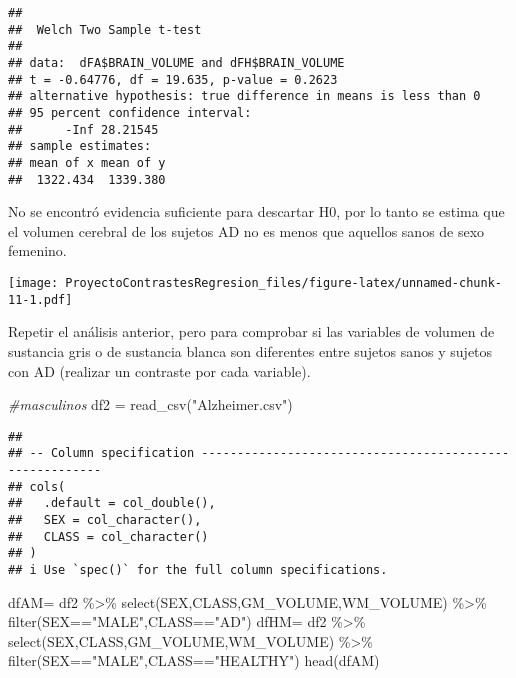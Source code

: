 \documentclass[
]{article}
\newenvironment{Shaded}{\begin{snugshade}}{\end{snugshade}}
\newcommand{\CommentTok}[1]{\textcolor[rgb]{0.56,0.35,0.01}{\textit{#1}}}
\newcommand{\FunctionTok}[1]{\textcolor[rgb]{0.00,0.00,0.00}{#1}}
\newcommand{\NormalTok}[1]{#1}
\newcommand{\OtherTok}[1]{\textcolor[rgb]{0.56,0.35,0.01}{#1}}
\newcommand{\SpecialCharTok}[1]{\textcolor[rgb]{0.00,0.00,0.00}{#1}}
\newcommand{\StringTok}[1]{\textcolor[rgb]{0.31,0.60,0.02}{#1}}
\begin{document}
\begin{verbatim}
## 
##  Welch Two Sample t-test
## 
## data:  dFA$BRAIN_VOLUME and dFH$BRAIN_VOLUME
## t = -0.64776, df = 19.635, p-value = 0.2623
## alternative hypothesis: true difference in means is less than 0
## 95 percent confidence interval:
##      -Inf 28.21545
## sample estimates:
## mean of x mean of y 
##  1322.434  1339.380
\end{verbatim}

No se encontró evidencia suficiente para descartar H0, por lo tanto se
estima que el volumen cerebral de los sujetos AD no es menos que
aquellos sanos de sexo femenino.

\begin{Shaded}
\end{Shaded}

\texttt{[image: ProyectoContrastesRegresion\_files/figure-latex/unnamed-chunk-11-1.pdf]}

Repetir el análisis anterior, pero para comprobar si las variables de
volumen de sustancia gris o de sustancia blanca son diferentes entre
sujetos sanos y sujetos con AD (realizar un contraste por cada
variable).

\begin{Shaded}
\begin{Highlighting}[]
\CommentTok{\#masculinos}
\NormalTok{df2 }\OtherTok{=} \FunctionTok{read\_csv}\NormalTok{(}\StringTok{"Alzheimer.csv"}\NormalTok{)}
\end{Highlighting}
\end{Shaded}

\begin{verbatim}
## 
## -- Column specification --------------------------------------------------------
## cols(
##   .default = col_double(),
##   SEX = col_character(),
##   CLASS = col_character()
## )
## i Use `spec()` for the full column specifications.
\end{verbatim}

\begin{Shaded}
\begin{Highlighting}[]
\NormalTok{dfAM}\OtherTok{=}\NormalTok{ df2 }\SpecialCharTok{\%\textgreater{}\%} \FunctionTok{select}\NormalTok{(SEX,CLASS,GM\_VOLUME,WM\_VOLUME) }\SpecialCharTok{\%\textgreater{}\%} \FunctionTok{filter}\NormalTok{(SEX}\SpecialCharTok{==}\StringTok{"MALE"}\NormalTok{,CLASS}\SpecialCharTok{==}\StringTok{"AD"}\NormalTok{)}
\NormalTok{dfHM}\OtherTok{=}\NormalTok{ df2 }\SpecialCharTok{\%\textgreater{}\%} \FunctionTok{select}\NormalTok{(SEX,CLASS,GM\_VOLUME,WM\_VOLUME) }\SpecialCharTok{\%\textgreater{}\%} \FunctionTok{filter}\NormalTok{(SEX}\SpecialCharTok{==}\StringTok{"MALE"}\NormalTok{,CLASS}\SpecialCharTok{==}\StringTok{"HEALTHY"}\NormalTok{)}
\FunctionTok{head}\NormalTok{(dfAM)}
\end{Highlighting}
\end{Shaded}
\end{document}
